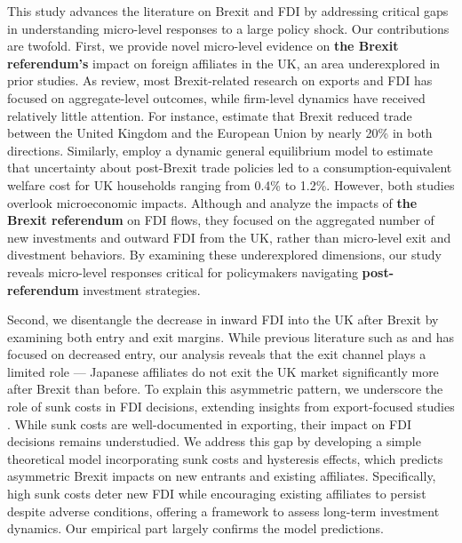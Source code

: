 \documentclass[preprint,11pt,authoryear]{elsarticle}
\begin{document}
This study advances the literature on Brexit and FDI by addressing critical gaps in understanding micro-level responses to a large policy shock. Our contributions are twofold.
First, we provide novel micro-level evidence on \textbf{the Brexit referendum's} impact on foreign affiliates in the UK, an area underexplored in prior studies. As \citet{dhingra2022expecting} review, most Brexit-related research on exports and FDI has focused on aggregate-level outcomes, while firm-level dynamics have received relatively little attention. For instance, \citet{kren2024} estimate that Brexit reduced trade between the United Kingdom and the European Union by nearly 20\% in both directions. Similarly, \citet{steinberg2019brexit} employ a dynamic general equilibrium model to estimate that uncertainty about post-Brexit trade policies led to a consumption-equivalent welfare cost for UK households ranging from 0.4\% to 1.2\%. However, both studies overlook microeconomic impacts.
Although \citet{breinlich2020} and \cite{cieslik2022brexit} analyze the impacts of \textbf{the Brexit referendum} on FDI flows, they focused on the aggregated number of new investments and outward FDI from the UK, rather than micro-level exit and divestment behaviors. By examining these underexplored dimensions, our study reveals micro-level responses critical for policymakers navigating \textbf{post-referendum} investment strategies.

Second, we disentangle the decrease in inward FDI into the UK after Brexit by examining both entry and exit margins. While previous literature such as \citet{breinlich2020} and \cite{cieslik2022brexit} has focused on decreased entry, our analysis reveals that the exit channel plays a limited role --- Japanese affiliates do not exit the UK market significantly more after Brexit than before. To explain this asymmetric pattern, we underscore the role of sunk costs in FDI decisions, extending insights from export-focused studies \citep{roberts1997decision, das2007market, handley2015trade, graziano2021brexit}. While sunk costs are well-documented in exporting, their impact on FDI decisions remains understudied. We address this gap by developing a simple theoretical model incorporating sunk costs and hysteresis effects, which predicts asymmetric Brexit impacts on new entrants and existing affiliates. Specifically, high sunk costs deter new FDI while encouraging existing affiliates to persist despite adverse conditions, offering a framework to assess long-term investment dynamics. Our empirical part largely confirms the model predictions.
\end{document}
